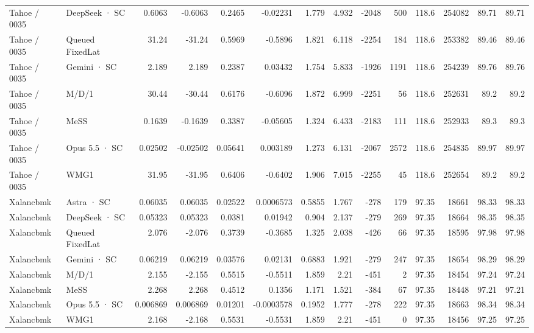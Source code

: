 \begin{tabular}{llrrrrrrrrrrrr}
Tahoe / 0035 & DeepSeek · SC & 0.6063 & -0.6063 & 0.2465 & -0.02231 & 1.779 & 4.932 & -2048 & 500 & 118.6 & 254082 & 89.71 & 89.71 \\
Tahoe / 0035 & Queued FixedLat & 31.24 & -31.24 & 0.5969 & -0.5896 & 1.821 & 6.118 & -2254 & 184 & 118.6 & 253382 & 89.46 & 89.46 \\
Tahoe / 0035 & Gemini · SC & 2.189 & 2.189 & 0.2387 & 0.03432 & 1.754 & 5.833 & -1926 & 1191 & 118.6 & 254239 & 89.76 & 89.76 \\
Tahoe / 0035 & M/D/1 & 30.44 & -30.44 & 0.6176 & -0.6096 & 1.872 & 6.999 & -2251 & 56 & 118.6 & 252631 & 89.2 & 89.2 \\
Tahoe / 0035 & MeSS & 0.1639 & -0.1639 & 0.3387 & -0.05605 & 1.324 & 6.433 & -2183 & 111 & 118.6 & 252933 & 89.3 & 89.3 \\
Tahoe / 0035 & Opus 5.5 · SC & 0.02502 & -0.02502 & 0.05641 & 0.003189 & 1.273 & 6.131 & -2067 & 2572 & 118.6 & 254835 & 89.97 & 89.97 \\
Tahoe / 0035 & WMG1 & 31.95 & -31.95 & 0.6406 & -0.6402 & 1.906 & 7.015 & -2255 & 45 & 118.6 & 252654 & 89.2 & 89.2 \\
Xalancbmk & Astra · SC & 0.06035 & 0.06035 & 0.02522 & 0.0006573 & 0.5855 & 1.767 & -278 & 179 & 97.35 & 18661 & 98.33 & 98.33 \\
Xalancbmk & DeepSeek · SC & 0.05323 & 0.05323 & 0.0381 & 0.01942 & 0.904 & 2.137 & -279 & 269 & 97.35 & 18664 & 98.35 & 98.35 \\
Xalancbmk & Queued FixedLat & 2.076 & -2.076 & 0.3739 & -0.3685 & 1.325 & 2.038 & -426 & 66 & 97.35 & 18595 & 97.98 & 97.98 \\
Xalancbmk & Gemini · SC & 0.06219 & 0.06219 & 0.03576 & 0.02131 & 0.6883 & 1.921 & -279 & 247 & 97.35 & 18654 & 98.29 & 98.29 \\
Xalancbmk & M/D/1 & 2.155 & -2.155 & 0.5515 & -0.5511 & 1.859 & 2.21 & -451 & 2 & 97.35 & 18454 & 97.24 & 97.24 \\
Xalancbmk & MeSS & 2.268 & 2.268 & 0.4512 & 0.1356 & 1.171 & 1.521 & -384 & 67 & 97.35 & 18448 & 97.21 & 97.21 \\
Xalancbmk & Opus 5.5 · SC & 0.006869 & 0.006869 & 0.01201 & -0.0003578 & 0.1952 & 1.777 & -278 & 222 & 97.35 & 18663 & 98.34 & 98.34 \\
Xalancbmk & WMG1 & 2.168 & -2.168 & 0.5531 & -0.5531 & 1.859 & 2.21 & -451 & 0 & 97.35 & 18456 & 97.25 & 97.25 \\
\bottomrule
\end{tabular}
